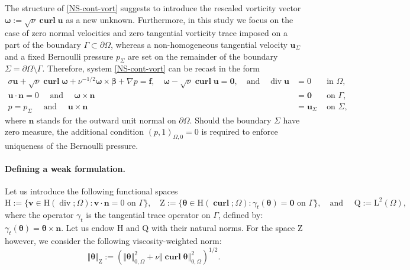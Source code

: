 \documentclass[reqno,a4paper]{article}
\numberwithin{equation}{section}
\newcommand\cero{\boldsymbol{0}}
\newcommand\ff{\boldsymbol{f}}
\newcommand\bu{\boldsymbol{u}}
\newcommand\bv{\boldsymbol{v}}
\newcommand\bbbeta{\boldsymbol{\beta}}
\renewcommand\O{\Omega}
\newcommand\G{\Gamma}
\renewcommand\H{\mathrm{H}}
\renewcommand\L{\mathrm{L}}
\newcommand\Q{\mathrm{Q}}
\newcommand\Z{\mathrm{Z}}
\newcommand\LO{\L^2(\O)}
\newcommand\vdiv{\mathop{\mathrm{div}}\nolimits}
\newcommand\bn{\boldsymbol{n}}
\newcommand\bomega{\boldsymbol{\omega}}
\newcommand\btheta{\boldsymbol{\theta}}
\newcommand\curl{\mathop{\mathbf{curl}}\nolimits}
\begin{document}
The structure of \eqref{NS-cont-vort} suggests to introduce the rescaled 
vorticity vector $\bomega:=\sqrt{\nu}\curl\bu$ as a new
unknown. Furthermore, 
in this study we focus on the case of zero normal velocities and zero 
tangential vorticity trace imposed on a part of the boundary $\Gamma\subset \partial\Omega$, 
whereas a non-homogeneous tangential velocity $\bu_{\Sigma}$ and a fixed Bernoulli pressure $p_\Sigma$ are set 
on the remainder of the boundary $\Sigma = \partial\Omega\setminus\Gamma$. 
Therefore, system \eqref{NS-cont-vort} can be recast in the form 
\begin{align}
\sigma\bu+\sqrt{\nu}\curl \bomega+\nu^{-1/2}\bomega\times\bbbeta +\nabla p  = 
  \ff, \quad 
  \bomega-\sqrt{\nu}\curl\bu  =  \cero, \quad \text{and} \quad 
\vdiv\bu & =  0 & \mbox{ in } \O, \nonumber  \\ 
  \bu\cdot\bn = 0 \quad \text{ and }  \quad \bomega\times\bn & = \cero&    
\mbox{ on } \G, \label{oseen-cont}\\ 
  p =p_\Sigma \quad \text{ and }  \quad   \bu\times\bn&=\bu_{\Sigma}&\mbox{ on } \Sigma,\nonumber
 \end{align}
where  $\bn$ stands for the outward unit normal
on $\partial\Omega$. Should the boundary $\Sigma$ have zero measure, 
the additional condition $ (p,1)_{\Omega,0} = 0$ is required to 
 enforce uniqueness of the 
Bernoulli pressure.


\paragraph{Defining a weak formulation.} 
Let us introduce the following functional spaces 
$$\H:=\{\bv\in\H(\vdiv;\O): \bv\cdot\bn=0\,\,\text{on}\,\,\G\}, \quad
\Z:=\{\btheta\in\H(\curl;\O): \gamma_{t}(\btheta)=\cero\,\,\text{on}\,\,\G\}, \quad 
 \text{and } \quad 
\Q:=\LO,$$
where the operator $\gamma_{t}$ is the tangential trace
operator on $\G$, defined by: $\gamma_{t}(\btheta)=\btheta\times\bn$.
Let us endow  $\H$ and $\Q$ with their natural norms. 
For the space $\Z$ however, we consider the following
viscosity-weighted norm: 
$$\Vert\btheta\Vert_{\Z}:=\left(\Vert\btheta\Vert_{0,\O}^2+
\nu\Vert\curl\btheta\Vert_{0,\O}^2\right)^{1/2}.$$ 
\end{document}
